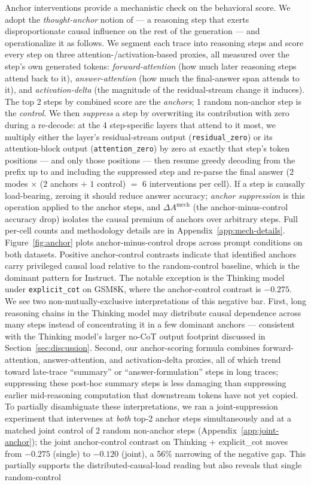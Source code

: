 \documentclass{article}
\theoremstyle{plain}
\theoremstyle{definition}
\theoremstyle{remark}
\begin{document}
Anchor interventions provide a mechanistic check on the behavioral score. We adopt the \emph{thought-anchor} notion of \citet{bogdan_thought_2025} --- a reasoning step that exerts disproportionate causal influence on the rest of the generation --- and operationalize it as follows. We segment each trace into reasoning steps and score every step on three attention-/activation-based proxies, all measured over the step's own generated tokens: \emph{forward-attention} (how much later reasoning steps attend back to it), \emph{answer-attention} (how much the final-answer span attends to it), and \emph{activation-delta} (the magnitude of the residual-stream change it induces). The top 2 steps by combined score are the \emph{anchors}; 1 random non-anchor step is the \emph{control}. We then \emph{suppress} a step by overwriting its contribution with zero during a re-decode: at the 4 step-specific layers that attend to it most, we multiply either the layer's residual-stream output (\texttt{residual\_zero}) or its attention-block output (\texttt{attention\_zero}) by zero at exactly that step's token positions --- and only those positions --- then resume greedy decoding from the prefix up to and including the suppressed step and re-parse the final answer ($2$ modes $\times$ ($2$ anchors $+$ $1$ control) $=$ 6 interventions per cell). If a step is causally load-bearing, zeroing it should reduce answer accuracy; \emph{anchor suppression} is this operation applied to the anchor steps, and $\Delta A^{\mathrm{mech}}$ (the anchor-minus-control accuracy drop) isolates the causal premium of anchors over arbitrary steps. Full per-cell counts and methodology details are in Appendix~\ref{app:mech-details}. Figure~\ref{fig:anchor} plots anchor-minus-control drops across prompt conditions on both datasets. Positive anchor-control contrasts indicate that identified anchors carry privileged causal load relative to the random-control baseline, which is the dominant pattern for Instruct. The notable exception is the Thinking model under \texttt{explicit\_cot} on GSM8K, where the anchor-control contrast is $-0.275$. We see two non-mutually-exclusive interpretations of this negative bar. First, long reasoning chains in the Thinking model may distribute causal dependence across many steps instead of concentrating it in a few dominant anchors --- consistent with the Thinking model's larger no-CoT output footprint discussed in Section~\ref{sec:discussion}. Second, our anchor-scoring formula combines forward-attention, answer-attention, and activation-delta proxies, all of which trend toward late-trace ``summary'' or ``answer-formulation'' steps in long traces; suppressing these post-hoc summary steps is less damaging than suppressing earlier mid-reasoning computation that downstream tokens have not yet copied. To partially disambiguate these interpretations, we ran a joint-suppression experiment that intervenes at \emph{both} top-2 anchor steps simultaneously and at a matched joint control of 2 random non-anchor steps (Appendix~\ref{app:joint-anchor}); the joint anchor-control contrast on Thinking + explicit\_cot moves from $-0.275$ (single) to $-0.120$ (joint), a 56\% narrowing of the negative gap. This partially supports the distributed-causal-load reading but also reveals that single random-control 
\end{document}
